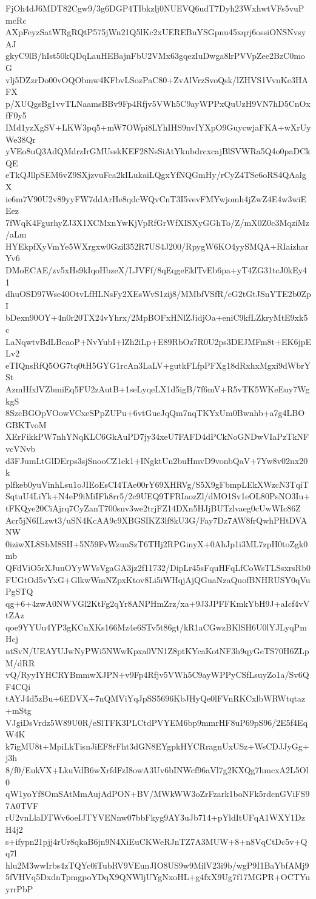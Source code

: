FjOh4dJ6MDT82Cgw9/3g6DGP4TIbkzlj0NUEVQ6udT7Dyh23WxhwtVFs5vuPmcRc
AXpFeyzSatWRgRQtP575jWn21Q5lKc2xUEREBnYSGpnu45xqrj6ossiONSNvsyAJ
gkyC9lB/hIst50kQDqLauHEBajnFbU2VMx63gqezIuDwga8lrPVVpZee2BzC0moG
vlj5DZzrDo00vOQObmw4KFbvLSozPaC80+ZvAlVrzSvoQsk/lZHVS1VvnKe3HAFX
p/XUQgsBg1vvTLNaamsBBv9Fp4Rfjv5VWh5C9ayWPPxQuUzH9VN7hD5CnOxfF0y5
IMd1yzXgSV+LKW3pq5+mW7OWpi8LYhIHS9nvIYXpO9GuycwjaFKA+wXrUyWe38Qr
yVEo8uQ3AdQMdrzIrGMUsskKEF28NsSiAtYkubdrcxcajBlSVWRa5Q4o0paDCkQE
eTkQJllpSEM6vZ9SXjzvuFca2kILukaiLQgxYfNQGmHy/rCyZ4TSe6oRS4QAalgX
ie6m7V90U2v89yyFW7ddArHe8qdcWQvCnT3I5vevFMYwjomh4jZwZ4E4w3wiEEez
7fWqK4FgurhyZJ3X1XCMxnYwKjVpRfGrWfXISXyGGhTo/Z/mX0Z0c3MqziMz/aLm
HYEkpfXyVmYe5WXrgxw0Gzil352R7US4J200/RpygW6KO4yySMQA+RIaizharYv6
DMoECAE/zv5xHs9kIqoHbzeX/LJVFf/8qEqgeEklTvEb6pa+yT4ZG31tcJ0kEy41
dhuOSD97Wse40OtvLfHLNsFy2XEsWvS1zij8/MMbfVSfR/cG2tGtJSnYTE2b0ZpI
bDexn90OY+4n0r20TX24vYhrx/2MpBOFxHNlZJidjOa+eniC9kfLZkryMtE9xk5c
LaNqwtvBdLBcaoP+NvYubI+lZh2iLp+E89RbOz7R0U2ps3DEJMFm8t+EK6jpELv2
eTIQnsRfQ5OG7tq0tH5GYG1rcAn3LaLV+gutkFLfpPFXg18dRxhxMgxi9dWbrYSt
AzmHfxlVZbmiEq5FU2zAutB+1seLyqeLX1d5igB/7f6mV+R5vTK5WKeEuy7WgkgS
8SzcBGOpVOowVCxeSPpZUPu+6vtGueJqQm7nqTKYxUm0Bwnhb+a7g4LBOGBKTvoM
XErFikkPW7nhYNqKLC6GkAuPD7jy34xeU7FAFD4dPCkNoGNDwVIaPzTkNFvcVNvb
d3FJumLtGlDErps3sjSnooCZ1ek1+INgktUn2buHmvD9vonbQaV+7Yw8v02nx20k
plfkeb0yuVinhLsu1oJIEoEsCI4TAe00rY69XHRVg/S5X9gFbmpLEkXWzcN3TqiT
SqtuU4LiYk+N4eP9iMiIFh8rr5/2c9UEQ9TFRIaozZl/dMO1Sv1eOL80PsNO3Iu+
tFKQye20CiAjrq7CyZanT700snv3we2trjFZ14DXn5HJjBUTzlvaeg0cUwWIc86Z
Acr5jN6ILzwt3/uSN4KcAA9c9XBGSIKZ3lf8kU3G/Fay7Dz7AW8frQwhPHtDVANW
0iziwXL8SbM8SH+5N59FvWzunSzT6THj2RPGinyX+0AhJp1i3ML7zpH0toZgk0mb
QFdViO5rXJuuOYyWVsVgaGA3jz2f11732/DipLr45sFquHFqLfCoWsTLSsxrsRb0
FUGtOd5vYxG+GlkwWmNZpxKtov8Li5iWHqjAjQGuaNzaQuofBNHRUSY0qVuPgSTQ
qg+6+4zwA0NWVGl2KtFg2qYr8ANPHmZrz/xa+9J3JPFFKmkYbH9J+aIcf4vVtZAz
qoe9YYUu4YP3gKCnXKs166Mz4e6STv5t86gt/kR1aCGwzBKlSH6U0lYJLyqPmHcj
ntSvN/UEAYUJwNyPWi5NWwKpxa0VN1Z8ptKYcaKotNF3h9qyGeTS70H6ZLpM/dRR
vQ/RyyIYHCRYBmmwXJPN+v9Fp4Rfjv5VWh5C9ayWPPyCSfLsuyZo1a/Sv6QF4CQi
tAYJ4d5zBu+6EDVX+7nQMViYqJpSS5696KbJHyQe0lFVnRKCxlbWRWtqtaz+mStg
VJgiDsVrdz5W89U0R/eSlTFK3PLCtdPVYEM6bp9mmrHF8uP69pS96/2E5f4EqW4K
k7igMU8t+MpiLkTisnJiEF8rFht3dGN8EYgpkHYCRragnUxUSz+WsCDJJyGg+j3h
8/f0/EukVX+LkuVdB6wXrfdFzI8owA3Uv6bINWcf96aVl7g2KXQg7hmcxA2L5Ol0
qW1yoYf8OmSAtMmAujAdPON+BV/MWkWW3oZrFzark1boNFk5rdcnGViFS97A0TVF
rU2vnLlaDTWv6oeIJTYVENnw07bbFkyg9AY3uJb714+pYldItUFqA1WXY1DzH4j2
s+ifypn21pjj4rUr8qkaB6jn9N4XiEuCKWeRJnTZ7A3MUW+8+n8VqCtDc5v+Qq7l
hlu2M3wwIrbs4zTQYc0iTubRV9VEunJIO8US9w9MilV23i9b/wgP9I1BaYbfAMj9
5fVHVq5DxdnTpmgpoYDqX9QNWljUYgNxoHL+g4fxX9Ug7f17MGPR+OCTYuyrrPbP

